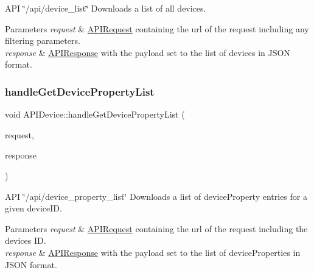 A\+PI \char`\"{}/api/device\+\_\+list\char`\"{} Downloads a list of all devices. 
\begin{DoxyParams}{Parameters}
{\em request} & \hyperlink{class_a_p_i_request}{A\+P\+I\+Request} containing the url of the request including any filtering parameters. \\
\hline
{\em response} & \hyperlink{class_a_p_i_response}{A\+P\+I\+Response} with the payload set to the list of devices in J\+S\+ON format. \\
\hline
\end{DoxyParams}
\mbox{\label{class_a_p_i_device_a5be87488af611d8ef61501a07e4a39d9}} 
\subsubsection{\texorpdfstring{handle\+Get\+Device\+Property\+List}{handleGetDevicePropertyList}}
{\footnotesize\ttfamily void A\+P\+I\+Device\+::handle\+Get\+Device\+Property\+List (\begin{DoxyParamCaption}\item[{const \hyperlink{class_a_p_i_request}{A\+P\+I\+Request} \&}]{request,  }\item[{\hyperlink{class_a_p_i_response}{A\+P\+I\+Response} $\ast$}]{response }\end{DoxyParamCaption})\hspace{0.3cm}{\ttfamily [slot]}}

A\+PI \char`\"{}/api/device\+\_\+property\+\_\+list\char`\"{} Downloads a list of device\+Property entries for a given device\+ID. 
\begin{DoxyParams}{Parameters}
{\em request} & \hyperlink{class_a_p_i_request}{A\+P\+I\+Request} containing the url of the request including the device\textquotesingle{}s ID. \\
\hline
{\em response} & \hyperlink{class_a_p_i_response}{A\+P\+I\+Response} with the payload set to the list of device\+Properties in J\+S\+ON format. \\
\hline
\end{DoxyParams}
\mbox{\label{class_a_p_i_device_a9fa95a9f88e738477ed5e32e22ae6990}} 
